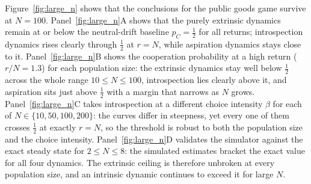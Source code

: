 \documentclass{article}
\begin{document}
Figure~\ref{fig:large_n} shows that the conclusions for the public goods game
survive at \(N = 100\). Panel~\ref{fig:large_n}A shows that the purely extrinsic
dynamics remain at or below the neutral-drift baseline \(p_C = \frac{1}{2}\) for
all returns; introspection dynamics rises clearly through \(\frac{1}{2}\) at \(r
= N\), while aspiration dynamics stays close to it. Panel~\ref{fig:large_n}B
shows the cooperation probability at a high return (\(r / N = 1.3\)) for each
population size: the extrinsic dynamics stay well below \(\frac{1}{2}\) across
the whole range \(10 \leq N \leq 100\), introspection lies clearly above it, and
aspiration sits just above \(\frac{1}{2}\) with a margin that narrows as \(N\)
grows. Panel~\ref{fig:large_n}C takes introspection at a different choice
intensity \(\beta\) for each of \(N \in \{10, 50, 100, 200\}\): the curves
differ in steepness, yet every one of them crosses \(\frac{1}{2}\) at exactly
\(r = N\), so the threshold is robust to both the population size and the choice
intensity. Panel~\ref{fig:large_n}D validates the simulator against the exact
steady state for \(2 \leq N \leq 8\): the simulated estimates bracket the exact
value for all four dynamics. The extrinsic ceiling is therefore unbroken at
every population size, and an intrinsic dynamic continues to exceed it for large
\(N\).
\end{document}
